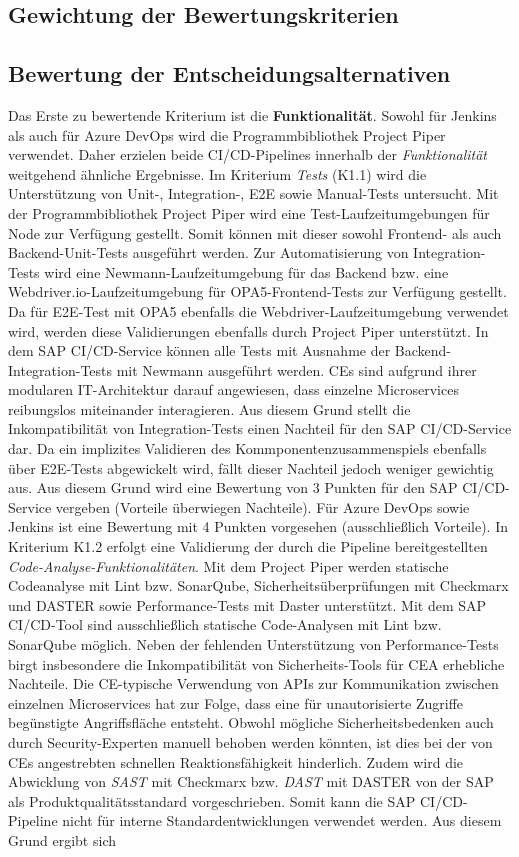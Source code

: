 \subsection{Gewichtung der Bewertungskriterien}

\subsection{Bewertung der Entscheidungsalternativen}
Das Erste zu bewertende Kriterium ist die \textbf{Funktionalität}. Sowohl für Jenkins als auch für Azure DevOps wird die Programmbibliothek Project Piper verwendet. Daher erzielen beide CI/CD-Pipelines innerhalb der \textit{Funktionalität} weitgehend ähnliche Ergebnisse.
Im Kriterium \textit{Tests} (K1.1) wird die Unterstützung von Unit-, Integration-, E2E sowie Manual-Tests untersucht. Mit der Programmbibliothek Project Piper wird eine Test-Laufzeitumgebungen für Node zur Verfügung gestellt. Somit können mit dieser sowohl Frontend- als auch Backend-Unit-Tests ausgeführt werden. Zur Automatisierung von Integration-Tests wird eine Newmann-Laufzeitumgebung für das Backend bzw. eine Webdriver.io-Laufzeitumgebung für OPA5-Frontend-Tests zur Verfügung gestellt. Da für E2E-Test mit OPA5 ebenfalls die Webdriver-Laufzeitumgebung verwendet wird, werden diese Validierungen ebenfalls durch Project Piper unterstützt. In dem SAP CI/CD-Service können alle Tests mit Ausnahme der Backend-Integration-Tests mit Newmann ausgeführt werden. CEs sind aufgrund ihrer modularen IT-Architektur darauf angewiesen, dass einzelne Microservices reibungslos miteinander interagieren. Aus diesem Grund stellt die Inkompatibilität von Integration-Tests einen Nachteil für den SAP CI/CD-Service dar. Da ein implizites Validieren des Kommponentenzusammenspiels ebenfalls über E2E-Tests abgewickelt wird, fällt dieser Nachteil jedoch weniger gewichtig aus. Aus diesem Grund wird eine Bewertung von 3 Punkten für den SAP CI/CD-Service vergeben (Vorteile überwiegen Nachteile). Für Azure DevOps sowie Jenkins ist eine Bewertung mit 4 Punkten vorgesehen (ausschließlich Vorteile). In Kriterium K1.2 erfolgt eine Validierung der durch die Pipeline bereitgestellten \textit{Code-Analyse-Funktionalitäten}. Mit dem Project Piper werden statische Codeanalyse mit Lint bzw. SonarQube, Sicherheitsüberprüfungen mit Checkmarx und DASTER sowie Performance-Tests mit Daster unterstützt. Mit dem SAP CI/CD-Tool sind ausschließlich statische Code-Analysen mit Lint bzw. SonarQube möglich. Neben der fehlenden Unterstützung von Performance-Tests birgt insbesondere die Inkompatibilität von Sicherheits-Tools  für CEA erhebliche Nachteile. Die CE-typische Verwendung von APIs zur Kommunikation zwischen einzelnen Microservices hat zur Folge, dass eine für unautorisierte Zugriffe begünstigte Angriffsfläche entsteht. Obwohl mögliche Sicherheitsbedenken auch durch Security-Experten manuell behoben werden könnten, ist dies bei der von CEs angestrebten schnellen Reaktionsfähigkeit hinderlich. Zudem wird die Abwicklung von \textit{\ac{SAST}} mit Checkmarx bzw. \textit{\ac{DAST}} mit DASTER von der SAP als Produktqualitätsstandard vorgeschrieben. Somit kann die SAP CI/CD-Pipeline nicht für interne Standardentwicklungen verwendet werden. Aus diesem Grund ergibt sich 